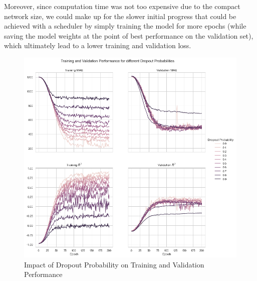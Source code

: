 \documentclass[12pt, letterpaper]{article}
\begin{document}
\begin{appendices}
    Moreover, since computation time was not too expensive due to the compact network size, we could make up for the slower initial progress that could be achieved with a scheduler by simply training the model for more epochs (while saving the model weights at the point of best performance on the validation set), which ultimately lead to a lower training and validation loss.

    \begin{figure}[t]
        \centering
        \includegraphics[width=\textwidth]{dropout_performance.png}
        \caption{Impact of Dropout Probability on Training and Validation Performance}
        \label{fig:dropout}
    \end{figure}

\end{appendices}



\end{document}
